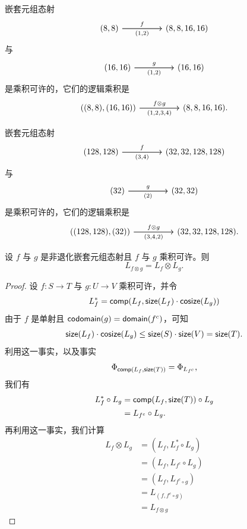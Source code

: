 \begin{example}
    嵌套元组态射
    \[\begin{tikzcd}
    (8,8) \ar[rr,"f"] \ar[rr,swap,"(1{,}2)"] & &  (8,8,16,16)
    \end{tikzcd} \]
    与
    \[\begin{tikzcd}
    (16,16) \ar[rr,"g"] \ar[rr,swap,"(1{,}2)"] & &  (16,16)
    \end{tikzcd} \]
    是乘积可许的，它们的逻辑乘积是
    \[\begin{tikzcd}
    ((8,8),(16,16))  \ar[rr,"f\otimes g"] \ar[rr,swap,"(1{,}2{,}3{,}4)"] & &  (8,8,16,16).
    \end{tikzcd} \]
\end{example}
\begin{example}
    嵌套元组态射
    \[\begin{tikzcd}
    (128,128) \ar[rr,"f"] \ar[rr,swap,"(3{,}4)"] & &  (32,32,128,128)
    \end{tikzcd} \]
    与
    \[\begin{tikzcd}
    (32) \ar[rr,"g"] \ar[rr,swap,"(2)"] & &  (32,32)
    \end{tikzcd} \]
    是乘积可许的，它们的逻辑乘积是
    \[\begin{tikzcd}
    ((128,128),(32))  \ar[rr,"f\otimes g"] \ar[rr,swap,"(3{,}4{,}2)"] & &  (32,32,128,128).
    \end{tikzcd} \]
\end{example}




\begin{proposition}\label{logicalproductcompatibility}
    设 $f$ 与 $g$ 是非退化嵌套元组态射且 $f$ 与 $g$ 乘积可许。则
    \[
    L_{f \otimes g} = L_f \otimes L_g.
    \]
\end{proposition}

\begin{proof} 设 $f:S \to T$ 与 $g:U \to V$ 乘积可许，并令
    \[
    L_f^* = \mathsf{comp}(L_f,\mathsf{size}(L_f)\cdot \mathsf{cosize}(L_g))
    \]
    由于 $f$ 是单射且 $\mathsf{codomain}(g) = \mathsf{domain}(f^c)$，可知
    \[\mathsf{size}(L_f) \cdot \mathsf{cosize}(L_g) \leq \mathsf{size}(S) \cdot \mathsf{size}(V) = \mathsf{size}(T).\]
    利用这一事实，以及事实
    \[\Phi_{\mathsf{comp}(L_f,\mathsf{size}(T))} = \Phi_{L_{f^c}},\]
    我们有
    \begin{align*}
    L_f^* \circ L_g & = \mathsf{comp}(L_f,\mathsf{size}(T)) \circ L_g\\
    & = L_{f^c} \circ L_g.
    \end{align*}
    再利用这一事实，我们计算
    \begin{align*}
        L_f \otimes L_g & = (L_f , L_f^* \circ L_g)\\
        & = (L_f , L_{f^c} \circ L_g)\\
        & = (L_f , L_{f^c \circ g})\\
        & = L_{(f , f^c \circ g)}\\
        & = L_{f \otimes g}
    \end{align*}
\end{proof}

\newpage

